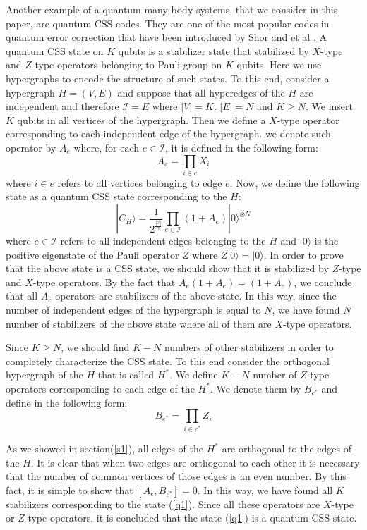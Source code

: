 \documentclass[preprintnumbers, showpacs, floatfix,twocolumn,
preprintnumbers, superscriptaddress]{revtex4}
\def\ra{\rangle}
\begin{document}
Another example of a quantum many-body systems, that we consider in this paper, are quantum CSS codes. They are one of the most popular codes in quantum error correction that have been introduced by Shor and et al \cite{Calderbank1996, Stean}. A quantum CSS state on $K$ qubits is a stabilizer state that stabilized by $X$-type and $Z$-type operators belonging to Pauli group on $K$ qubits. Here we use hypergraphs to encode the structure of such states. To this end, consider a hypergraph $H=(V,E)$ and suppose that all hyperedges of the $H$ are independent and therefore $\mathcal{I}=E$ where $|V|=K$, $|E|=N$ and $K\geq N$. We insert $K$ qubits in all vertices of the hypergraph. Then we define a $X$-type operator corresponding to each independent edge of the hypergraph. we denote such operator by $A_e$ where, for each $e\in \mathcal{I}$, it is defined in the following form:
\begin{equation}
A_e =\prod_{i\in e}X_i
\end{equation}
where $i \in e$ refers to all vertices belonging to edge $e$. Now, we define the following state as a quantum CSS state corresponding to the $H$:
\begin{equation}\label{q1}
|C_H\ra=\frac{1}{2^{\frac{|\mathcal{I}|}{2}}}\prod_{e \in \mathcal{I}}(1+A_e )|0\ra ^{\otimes N}
\end{equation}
where $e\in \mathcal{I}$ refers to all independent edges belonging to the $H$ and $|0\ra$ is the positive eigenstate of the Pauli operator $Z$ where $Z|0\ra=|0\ra$. In order to prove that the above state is a CSS state, we should show that it is stabilized by $Z$-type and $X$-type operators. By the fact that $A_e (1+A_e)=(1+A_e)$, we conclude that all $A_e$ operators are stabilizers of the above state. In this way, since the number of independent edges of the hypergraph is equal to $N$, we have found $N$ number of stabilizers of the above state where all of them are $X$-type operators.

Since $K\geq N$, we should find $K-N$ numbers of other stabilizers
in order to completely characterize the CSS state. To this end
consider the orthogonal hypergraph of the $H$ that is
called $H^{*} $. We define $K-N$ number of $Z$-type operators
corresponding to each edge of the $H^{*}$. We denote them by
$B_{e^{*}}$ and define in the following form:
\begin{equation}
B_{e^{*}} =\prod_{i\in e^{*}}Z_i
\end{equation}

As we showed in section(\ref{s1}), all edges of the $H^{*}$ are orthogonal to the edges of the $H$. It is clear that when two edges are orthogonal to each other it is necessary that the number of common vertices of those edges is an even number. By this fact, it is simple to show that $[A_e , B_{e^{*}}]=0$. In this way, we have found all $K$ stabilizers corresponding to the state (\ref{q1}). Since all these operators are $X$-type or $Z$-type operators, it is concluded that the state (\ref{q1}) is a quantum CSS state.
\end{document}
